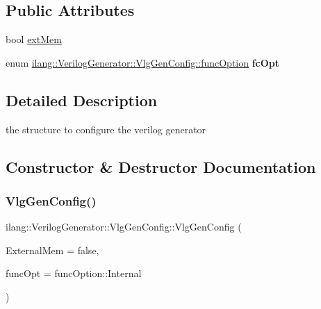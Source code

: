 \subsection*{Public Attributes}
\begin{DoxyCompactItemize}
\item 
bool \mbox{\hyperlink{structilang_1_1_verilog_generator_1_1_vlg_gen_config_ac18ab88b5ead347495aaf8724cdd245d}{ext\+Mem}}
\item 
\mbox{\label{structilang_1_1_verilog_generator_1_1_vlg_gen_config_a50ab814169b0ae140644949c05ba7155}} 
enum \mbox{\hyperlink{structilang_1_1_verilog_generator_1_1_vlg_gen_config_aa081357e4c256bb0e0dca0d9f2bd9a96}{ilang\+::\+Verilog\+Generator\+::\+Vlg\+Gen\+Config\+::func\+Option}} {\bfseries fc\+Opt}
\end{DoxyCompactItemize}


\subsection{Detailed Description}
the structure to configure the verilog generator 

\subsection{Constructor \& Destructor Documentation}
\mbox{\label{structilang_1_1_verilog_generator_1_1_vlg_gen_config_a7e2941ee0336d21aefc24c1ec2ed6038}} 
\subsubsection{\texorpdfstring{Vlg\+Gen\+Config()}{VlgGenConfig()}}
{\footnotesize\ttfamily ilang\+::\+Verilog\+Generator\+::\+Vlg\+Gen\+Config\+::\+Vlg\+Gen\+Config (\begin{DoxyParamCaption}\item[{bool}]{External\+Mem = {\ttfamily false},  }\item[{\mbox{\hyperlink{structilang_1_1_verilog_generator_1_1_vlg_gen_config_aa081357e4c256bb0e0dca0d9f2bd9a96}{func\+Option}}}]{func\+Opt = {\ttfamily funcOption\+:\+:Internal} }\end{DoxyParamCaption})\hspace{0.3cm}{\ttfamily [inline]}}

